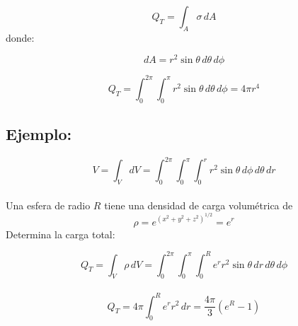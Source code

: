 \documentclass[a4paper,12pt]{article}
\begin{document}
\[
Q_T = \int_{A} \sigma\, dA
\]
donde:

\[
dA = r^{2}\sin\theta\, d\theta\, d\phi
\]

\[
Q_T = \int_{0}^{2\pi}\int_{0}^{\pi} r^{2}\sin\theta\, d\theta\, d\phi = 4\pi r^{4}
\]
\subsection*{Ejemplo:}
\[
V = \int_{V} dV = \int_{0}^{2\pi}\int_{0}^{\pi}\int_{0}^{r} r^{2}\sin\theta\, d\phi\, d\theta\, dr
\]\\
Una esfera de radio $R$ tiene una densidad de carga volumétrica de 
\[
\rho = e^{(x^{2}+y^{2}+z^{2})^{1/2}} = e^{r}
\]
Determina la carga total:

\[
Q_T = \int_{V} \rho\, dV = \int_{0}^{2\pi}\int_{0}^{\pi}\int_{0}^{R} e^{r} r^{2}\sin\theta\, dr\, d\theta\, d\phi
\]\\
\[
Q_T = 4\pi \int_{0}^{R} e^{r} r^{2}\, dr = \frac{4\pi}{3}\left(e^{R} - 1\right)
\]
\newpage
\noindent
\end{document}
